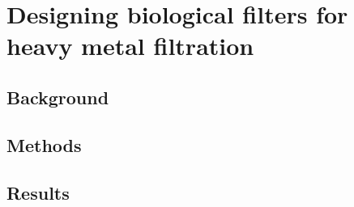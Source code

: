 \documentclass[../main/main]{subfiles}
\begin{document}
\chapter{Designing biological filters for heavy metal filtration}

\section{Background}

\section{Methods}

\section{Results}
\end{document}
